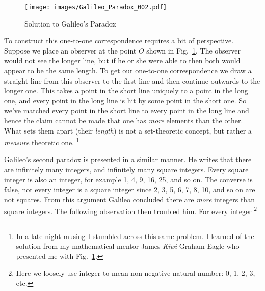             \begin{figure}[H]
                \centering
                \captionsetup{type=figure}
                \if{}
                    \texttt{[image: images/Galileo\_Paradox\_002.pdf]}
                \fi
                \caption{Solution to Galileo's Paradox}
                \label{fig:Galileo_Paradox_002}
            \end{figure}
            To construct this one-to-one correspondence requires a bit of
            perspective. Suppose we place an observer at the point $O$ shown in
            Fig.~\ref{fig:Galileo_Paradox_002}. The observer would not see the
            longer line, but if he or she were able to then both would appear to
            be the same length. To get our one-to-one correspondence we draw a
            straight line from this observer to the first line and then continue
            outwards to the longer one. This takes a point in the short line
            uniquely to a point in the long one, and every point in the long
            line is hit by some point in the short one. So we've matched every
            point in the short line to every point in the long line and hence
            the claim cannot be made that one has \textit{more} elements than
            the other. What sets them apart (their \textit{length}) is not a
            set-theoretic concept, but rather a \textit{measure} theoretic one.%
            \footnote{%
                In a late night musing I stumbled across this same problem. I
                learned of the solution from my mathematical mentor James
                \textit{Kiwi} Graham-Eagle who presented me with
                Fig.~\ref{fig:Galileo_Paradox_002}.
            }
            \par\hfill\par
            Galileo's second paradox is presented in a similar manner. He writes
            that there are infinitely many integers, and infinitely many square
            integers. Every square integer is also an integer, for example 1, 4,
            9, 16, 25, and so on. The converse is false, not every integer is a
            square integer since 2, 3, 5, 6, 7, 8, 10, and so on are not
            squares. From this argument Galileo concluded there are
            \textit{more} integers than square integers. The following
            observation then troubled him. For every integer%
            \footnote{%
                Here we loosely use integer to mean non-negative natural number:
                0, 1, 2, 3, etc.
            }
